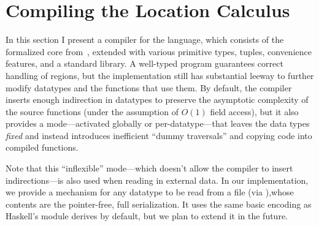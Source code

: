 

\section{Compiling the Location Calculus} \label{sec:impl-local}

In this section I present a compiler for the \ourcalc language, which consists of
the formalized core from~, extended with various primitive types, tuples,
convenience features, and a standard library.
%
A well-typed \ourcalc program guarantees correct handling of regions, but the
implementation still has substantial leeway to further modify datatypes and
the functions that use them.
%
By default, the compiler inserts enough indirection in
datatypes to preserve the asymptotic complexity of the source functions (under
the assumption of $O(1)$ field access), but it also provides a mode---activated
globally or per-datatype---that leaves the data types
\emph{fixed} and instead introduces inefficient ``dummy traversals'' and copying
code into compiled functions.
%
%

{Note that this ``inflexible'' mode---which doesn't allow the compiler to
  insert indirections---is also used when reading in external data.  In our
  \ourcalc implementation, we provide a mechanism for any datatype to be read
  from a file (via ),whose contents are the pointer-free, full
  serialization.  It uses the same basic encoding as Haskell's
   module derives by default, but we plan to extend it in the
  future.}

